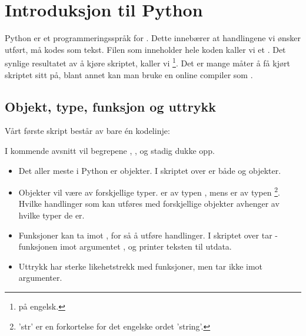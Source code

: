 






\section{Introduksjon til Python}
Python er et programmeringsspråk for . Dette innebærer at handlingene vi ønsker utført, må kodes som tekst. Filen som inneholder hele koden kaller vi et . Det synlige resultatet av å kjøre skriptet, kaller vi \footnote{ på engelsk.}. Det er mange måter å få kjørt skriptet sitt på, blant annet kan man bruke en online compiler som .
\subsection{Objekt, type, funksjon og uttrykk}
Vårt første skript består av bare én kodelinje:


I kommende avsnitt vil begrepene , ,  og  stadig dukke opp.
\begin{itemize}
	\item Det aller meste i Python er objekter. I skriptet over er både  og  objekter.
	\item Objekter vil være av forskjellige typer.  er av typen , mens  er av typen \footnote{'str' er en forkortelse for det engelske ordet 'string'.}. Hvilke handlinger som kan utføres med forskjellige objekter avhenger av hvilke typer de er.
	\item Funksjoner kan ta imot , for så å utføre handlinger. I skriptet over tar -funksjonen imot argumentet , og printer teksten til utdata.
	\item Uttrykk har sterke likehetstrekk med funksjoner, men tar ikke imot argumenter.
\end{itemize}
\newpage


